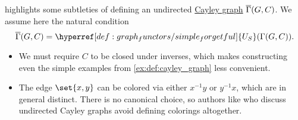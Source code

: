 \begin{remark}\label{rem:undirected_cayley_graph}
   highlights some subtleties of defining an undirected \hyperref[def:cayley_graph]{Cayley graph} \( \oline{\Gamma}(G, C) \). We assume here the natural condition
  \begin{equation*}
    \oline{\Gamma}(G, C) = \hyperref[def:graph_functors/simple_forgetful]{U_S}(\Gamma(G, C)).
  \end{equation*}

  \begin{itemize}
    \item We must require \( C \) to be closed under inverses, which makes constructing even the simple examples from \cref{ex:def:cayley_graph} less convenient.

    \item The edge \( \set{ x, y } \) can be colored via either \( x^{-1} y \) or \( y^{-1} x \), which are in general distinct. There is no canonical choice, so authors like  who discuss undirected Cayley graphs avoid defining colorings altogether.
  \end{itemize}
\end{remark}

